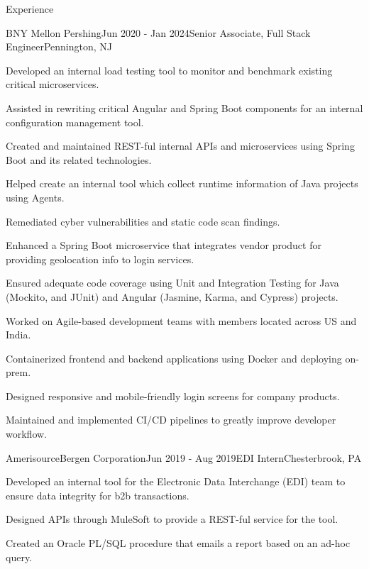 \documentclass[
11pt, %
]{resume} %
\begin{document}
\begin{rSection}{Experience}

	\begin{rSubsection}{BNY Mellon \textbar{} Pershing}{Jun 2020 - Jan 2024}{Senior Associate, Full Stack Engineer}{Pennington, NJ}
		\item Developed an internal load testing tool to monitor and benchmark existing critical microservices.
		\item Assisted in rewriting critical Angular and Spring Boot components for an internal configuration management tool.
		\item Created and maintained REST-ful internal APIs and microservices using Spring Boot and its related technologies.
		\item Helped create an internal tool which collect runtime information of Java projects using Agents.
		\item Remediated cyber vulnerabilities and static code scan findings.
		\item Enhanced a Spring Boot microservice that integrates vendor product for providing geolocation info to login services.
		\item Ensured adequate code coverage using Unit and Integration Testing for Java (Mockito, and JUnit) and Angular (Jasmine, Karma, and Cypress) projects.
		\item Worked on Agile-based development teams with members located across US and India.
		\item Containerized frontend and backend applications using Docker and deploying on-prem.
		\item Designed responsive and mobile-friendly login screens for company products.
		\item Maintained and implemented CI/CD pipelines to greatly improve developer workflow.
	\end{rSubsection}


	\begin{rSubsection}{AmerisourceBergen Corporation}{Jun 2019 - Aug 2019}{EDI Intern}{Chesterbrook, PA}
		\item Developed an internal tool for the Electronic Data Interchange (EDI) team to ensure data integrity for b2b transactions.
		\item Designed APIs through MuleSoft to provide a REST-ful service for the tool.
		\item Created an Oracle PL/SQL procedure that emails a report based on an ad-hoc query.
	\end{rSubsection}


\end{rSection}
\end{document}

